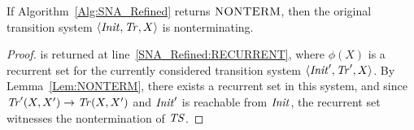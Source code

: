 \begin{lemma}\label{Lem:FinalNontermination}
     If Algorithm~\ref{Alg:SNA_Refined} returns $\textsc{NONTERM}$, then the original transition system $\langle \mathit{Init}, \mathit{Tr}, X \rangle$ is nonterminating.
\end{lemma}
\begin{proof}
     \NONTERM is returned at line~\ref{SNA_Refined:RECURRENT}, where 
    $\phi(X)$ is a recurrent set for the currently considered transition system $\langle \mathit{Init}', \mathit{Tr}', X \rangle$.
    By Lemma~\ref{Lem:NONTERM}, there exists a recurrent set in this system, and since
    $\mathit{Tr}'(X,X') \rightarrow \mathit{Tr}(X,X')$ and $\mathit{Init}'$ is reachable from $\mathit{Init}$, the
    recurrent set witnesses the nontermination of $\mathit{TS}$.
\end{proof}

